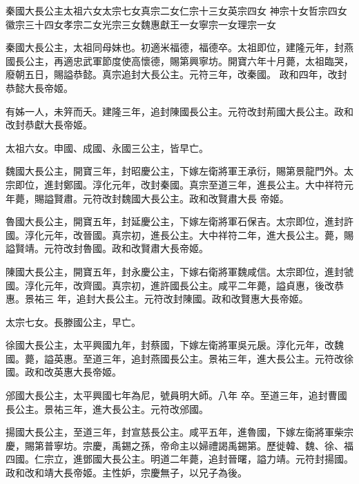 
\begin{pinyinscope}

 秦國大長公主太祖六女太宗七女真宗二女仁宗十三女英宗四女
 神宗十女哲宗四女徽宗三十四女孝宗二女光宗三女魏惠獻王一女寧宗一女理宗一女



 秦國大長公主，太祖同母妹也。初適米福德，福德卒。太祖即位，建隆元年，封燕國長公主，再適忠武軍節度使高懷德，賜第興寧坊。開寶六年十月薨，太祖臨哭，廢朝五日，賜謚恭懿。真宗追封大長公主。元符三年，改秦國。
 政和四年，改封恭懿大長帝姬。



 有姊一人，未笄而夭。建隆三年，追封陳國長公主。元符改封荊國大長公主。政和改封恭獻大長帝姬。



 太祖六女。申國、成國、永國三公主，皆早亡。



 魏國大長公主，開寶三年，封昭慶公主，下嫁左衛將軍王承衍，賜第景龍門外。太宗即位，進封鄭國。淳化元年，改封秦國。真宗至道三年，進長公主。大中祥符元年薨，賜謚賢肅。元符改封魏國大長公主。政和改賢肅大長
 帝姬。



 魯國大長公主，開寶五年，封延慶公主，下嫁左衛將軍石保吉。太宗即位，進封許國。淳化元年，改晉國。真宗初，進長公主。大中祥符二年，進大長公主。薨，賜謚賢靖。元符改封魯國。政和改賢肅大長帝姬。



 陳國大長公主，開寶五年，封永慶公主，下嫁右衛將軍魏咸信。太宗即位，進封虢國。淳化元年，改齊國。真宗初，進許國長公主。咸平二年薨，謚貞惠，後改恭惠。景祐三
 年，追封大長公主。元符改封陳國。政和改賢惠大長帝姬。



 太宗七女。長滕國公主，早亡。



 徐國大長公主，太平興國九年，封蔡國，下嫁左衛將軍吳元扆。淳化元年，改魏國。薨，謚英惠。至道三年，追封燕國長公主。景祐三年，進大長公主。元符改徐國。政和改英惠大長帝姬。



 邠國大長公主，太平興國七年為尼，號員明大師。八年
 卒。至道三年，追封曹國長公主。景祐三年，進大長公主。元符改邠國。



 揚國大長公主，至道三年，封宣慈長公主。咸平五年，進魯國，下嫁左衛將軍柴宗慶，賜第普寧坊。宗慶，禹錫之孫，帝命主以婦禮謁禹錫第。歷徙韓、魏、徐、福四國。仁宗立，進鄧國大長公主。明道二年薨，追封晉曙，謚力靖。元符封揚國。政和改和靖大長帝姬。主性妒，宗慶無子，以兄子為後。




\end{pinyinscope}
